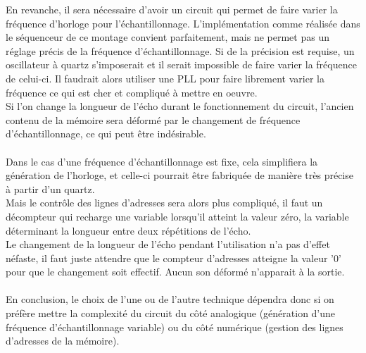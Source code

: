 \documentclass{article}
\begin{document}
En revanche, il sera nécessaire d'avoir un circuit qui permet de faire varier la fréquence d'horloge pour l'échantillonnage. L'implémentation comme réalisée dans le séquenceur de ce montage convient parfaitement, mais ne permet pas un réglage précis de la fréquence d'échantillonnage. Si de la précision est requise, un oscillateur à quartz s'imposerait et il serait impossible de faire varier la fréquence de celui-ci. Il faudrait alors utiliser une PLL pour faire librement varier la fréquence ce qui est cher et compliqué à mettre en oeuvre.
\\
Si l'on change la longueur de l'écho durant le fonctionnement du circuit, l'ancien contenu de la mémoire sera déformé par le changement de fréquence d'échantillonnage, ce qui peut être indésirable.
\\\\
Dans le cas d'une fréquence d'échantillonnage est fixe, cela simplifiera la génération de l'horloge, et celle-ci pourrait être fabriquée de manière très précise à partir d'un quartz.
\\
Mais le contrôle des lignes d'adresses sera alors plus compliqué, il faut un décompteur qui recharge une variable lorsqu'il atteint la valeur zéro, la variable déterminant la longueur entre deux répétitions de l'écho.
\\
Le changement de la longueur de l'écho pendant l'utilisation n'a pas d'effet néfaste, il faut juste attendre que le compteur d'adresses atteigne la valeur '0' pour que le changement soit effectif. Aucun son déformé n'apparait à la sortie.
\\\\
En conclusion, le choix de l'une ou de l'autre technique dépendra donc si on préfère mettre la complexité du circuit du côté analogique (génération d'une fréquence d'échantillonnage variable) ou du côté numérique (gestion des lignes d'adresses de la mémoire).
\end{document}
